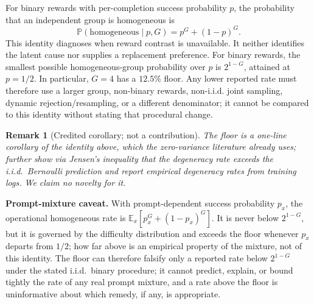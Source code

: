 \documentclass{article}
\newtheorem{remark}{Remark}
\newcommand{\E}{\mathbb{E}}
\newcommand{\Prob}{\mathbb{P}}
\begin{document}
For binary rewards with per-completion success probability $p$, the probability
that an independent group is homogeneous is
\begin{equation}
  \Prob(\text{homogeneous}\mid p,G)=p^G+(1-p)^G.
\end{equation}
This identity diagnoses when reward contrast is unavailable.  It neither
identifies the latent cause nor supplies a replacement preference.
For binary rewards, the smallest possible homogeneous-group probability over
$p$ is $2^{1-G}$, attained at $p=1/2$.  In particular, $G=4$ has a $12.5\%$
floor.  Any lower reported rate must therefore use a larger group, non-binary
rewards, non-i.i.d. joint sampling, dynamic rejection/resampling, or a different denominator; it cannot
be compared to this identity without stating that procedural change.
\begin{remark}[Credited corollary; not a contribution]
The floor is a one-line corollary of the identity above, which the
zero-variance literature already uses; \citet{nie2026gradient} further show
via Jensen's inequality that the degeneracy rate exceeds the i.i.d.\
Bernoulli prediction and report empirical degeneracy rates from training
logs. We claim no novelty for it.
\end{remark}
\noindent\textbf{Prompt-mixture caveat.} With prompt-dependent success
probability $p_x$, the operational homogeneous rate is
$\E_x[p_x^G+(1-p_x)^G]$. It is never below $2^{1-G}$, but it is governed by
the difficulty distribution and exceeds the floor whenever $p_x$ departs
from $1/2$; how far above is an empirical property of the mixture, not of
this identity. The floor can therefore falsify
only a reported rate below $2^{1-G}$ under the stated i.i.d.\ binary
procedure; it cannot predict, explain, or bound tightly the rate of any
real prompt mixture, and a rate above the floor is uninformative about
which remedy, if any, is appropriate.
\end{document}
